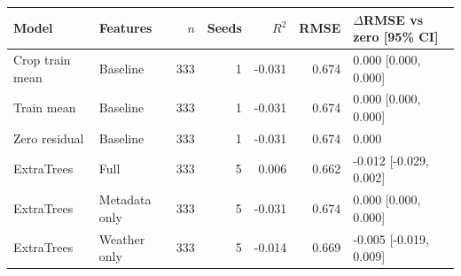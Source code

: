 \begin{tabular}{llrrrrl}
\toprule
Model & Features & $n$ & Seeds & $R^2$ & RMSE & $\Delta$RMSE vs zero [95\% CI] \\
\midrule
Crop train mean & Baseline & 333 & 1 & -0.031 & 0.674 & 0.000 [0.000, 0.000] \\
Train mean & Baseline & 333 & 1 & -0.031 & 0.674 & 0.000 [0.000, 0.000] \\
Zero residual & Baseline & 333 & 1 & -0.031 & 0.674 & 0.000 \\
ExtraTrees & Full & 333 & 5 & 0.006 & 0.662 & -0.012 [-0.029, 0.002] \\
ExtraTrees & Metadata only & 333 & 5 & -0.031 & 0.674 & 0.000 [0.000, 0.000] \\
ExtraTrees & Weather only & 333 & 5 & -0.014 & 0.669 & -0.005 [-0.019, 0.009] \\
\bottomrule
\end{tabular}
